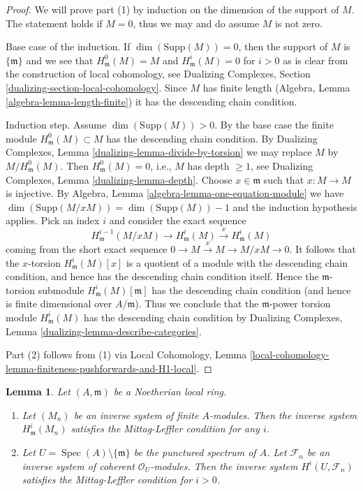 \documentclass{stacks-project}
\theoremstyle{plain}
\newtheorem{lemma}[subsection]{Lemma}
\theoremstyle{definition}
\theoremstyle{remark}
\numberwithin{equation}{subsection}
\def\Spec{\mathop{\mathrm{Spec}}}
\begin{document}
\begin{proof}
We will prove part (1) by induction on the dimension of the support of $M$.
The statement holds if $M = 0$, thus we may and do assume $M$ is not zero.

\medskip\noindent
Base case of the induction.
If $\dim(\text{Supp}(M)) = 0$, then the support
of $M$ is $\{\mathfrak m\}$ and we see that $H^0_\mathfrak m(M) = M$
and $H^i_\mathfrak m(M) = 0$ for $i > 0$ as is clear from the
construction of local cohomology, see
Dualizing Complexes, Section \ref{dualizing-section-local-cohomology}.
Since $M$ has finite length (Algebra, Lemma \ref{algebra-lemma-length-finite})
it has the descending chain condition.

\medskip\noindent
Induction step. Assume $\dim(\text{Supp}(M)) > 0$.
By the base case the finite module $H^0_\mathfrak m(M) \subset M$
has the descending chain condition.
By Dualizing Complexes, Lemma \ref{dualizing-lemma-divide-by-torsion}
we may replace $M$ by $M/H^0_\mathfrak m(M)$.
Then $H^0_\mathfrak m(M) = 0$, i.e., $M$ has depth $\geq 1$, see
Dualizing Complexes, Lemma \ref{dualizing-lemma-depth}.
Choose $x \in \mathfrak m$ such that $x : M \to M$ is injective.
By Algebra, Lemma \ref{algebra-lemma-one-equation-module} we have
$\dim(\text{Supp}(M/xM)) = \dim(\text{Supp}(M)) - 1$ and the
induction hypothesis applies. Pick an index $i$ and consider the
exact sequence
$$
H^{i - 1}_\mathfrak m(M/xM) \to H^i_\mathfrak m(M) \xrightarrow{x}
H^i_\mathfrak m(M)
$$
coming from the short exact sequence $0 \to M \xrightarrow{x} M \to M/xM \to 0$.
It follows that the $x$-torsion $H^i_\mathfrak m(M)[x]$
is a quotient of a module with the descending chain condition, and
hence has the descending chain condition itself. Hence the
$\mathfrak m$-torsion submodule $H^i_\mathfrak m(M)[\mathfrak m]$ has
the descending chain condition (and hence is finite dimensional
over $A/\mathfrak m$). Thus we conclude that the $\mathfrak m$-power
torsion module $H^i_\mathfrak m(M)$ has the descending chain
condition by Dualizing Complexes, Lemma
\ref{dualizing-lemma-describe-categories}.

\medskip\noindent
Part (2) follows from (1) via Local Cohomology,
Lemma \ref{local-cohomology-lemma-finiteness-pushforwards-and-H1-local}.
\end{proof}

\begin{lemma}
\label{lemma-ML-local}
Let $(A, \mathfrak m)$ be a Noetherian local ring.
\begin{enumerate}
\item Let $(M_n)$ be an inverse system of finite $A$-modules. Then the
inverse system $H^i_\mathfrak m(M_n)$ satisfies the Mittag-Leffler
condition for any $i$.
\item Let $U = \Spec(A) \setminus \{\mathfrak m\}$ be the
punctured spectrum of $A$.
Let $\mathcal{F}_n$ be an inverse system of
coherent $\mathcal{O}_U$-modules.
Then the inverse system $H^i(U, \mathcal{F}_n)$
satisfies the Mittag-Leffler condition for $i > 0$.
\end{enumerate}
\end{lemma}
\end{document}
